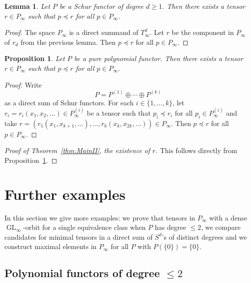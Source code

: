 \documentclass{amsart}
\theoremstyle{plain}
\newtheorem{lm}[thm]{Lemma}
\newtheorem{prop}[thm]{Proposition}
\theoremstyle{definition}
\DeclareMathOperator{\GL}{GL}
\begin{document}
\begin{lm}
Let $P$ be a Schur functor of degree $d\geq 1$. Then there exists a tensor $r\in P_{\infty}$ such that $p\preceq r$ for all $p\in P_{\infty}$.
\end{lm}
\begin{proof}
The space $P_{\infty}$ is a direct summand of $T^d_{\infty}$. Let $r$ be the component in $P_{\infty}$ of $r_d$ from the previous lemma. Then $p\preceq r$ for all $p\in P_{\infty}$.
\end{proof}

\begin{prop}\label{prop:max_el}
Let $P$ be a pure polynomial functor. Then there exists a tensor $r\in P_{\infty}$ such that $p\preceq r$ for all $p\in P_{\infty}$.
\end{prop}
\begin{proof}
Write
\[
P=P^{(1)}\oplus\cdots\oplus P^{(k)}
\]
as a direct sum of Schur functors. For each $i\in\{1,\ldots,k\}$, let $r_i=r_i(x_1,x_2,\ldots)\in P^{(i)}_{\infty}$ be a tensor such that $p_i\preceq r_i$ for all $p_i\in P^{(i)}_{\infty}$ and take $r=(r_1(x_1,x_{k+1},\ldots),\ldots,r_k(x_k,x_{2k},\ldots))\in P_{\infty}$. Then $p\preceq r$ for all $p\in P_{\infty}$.
\end{proof}

\begin{proof}[Proof of Theorem~\ref{thm:MainII}, the existence of $r$]
This follows directly from Proposition~\ref{prop:max_el}.
\end{proof}

\section{Further examples}\label{sec:examples}
In this section we give more examples: we prove that tensors in $P_{\infty}$ with a dense $\GL_{\infty}$-orbit for a single equivalence class when $P$ has degree $\leq 2$, we compare candidates for minimal tensors in a direct sum of $S^d$'s of distinct degrees and we construct maximal elements in $P_{\infty}$ for all $P$ with $P(\{0\})=\{0\}$.

\subsection{Polynomial functors of degree $\leq 2$}
\end{document}
